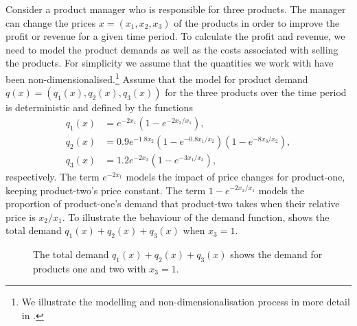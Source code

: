 \documentclass[main.tex]{subfiles}
\begin{document}
Consider a product manager who is responsible for three products.
The manager can change the prices
$x=(x_1,x_2,x_3)$
of the products in order to improve the profit or revenue for a given
time period.
To calculate the profit and revenue, we need to model the product
demands as well as the costs associated with selling the products.
For simplicity we assume that the quantities we work with have
been non-dimensionalised.\footnote{We illustrate the modelling and
  non-dimensionalisation process in more detail
  in .}
Assume that the model for product demand $q(x)=(q_1(x),q_2(x),q_3(x))$
for the three products over the time period is
deterministic and defined by the functions
\begin{align}
  q_1(x) &= e^{-2x_1}(1-e^{-2x_2/x_1}),\\
  q_2(x) &= 0.9e^{-1.8x_2}(1-e^{-0.8x_1/x_2})(1-e^{-8x_3/x_2}),\\
  q_3(x) &= 1.2e^{-2x_3}(1-e^{-3x_1/x_3}),
\end{align}
respectively.
The term $e^{-2x_1}$  models the impact of price
changes for product-one, keeping product-two's price constant.
The term $1-e^{-2x_2/x_1}$ models the proportion of product-one's
demand that product-two takes when their relative price is $x_2/x_1$.
To illustrate the behaviour of the demand function,
 shows the total demand $q_1(x)+q_2(x)+q_3(x)$ when
$x_3=1$.
\begin{figure}[htbp]
  \centering
  \caption[Demand for three products]{The total demand $q_1(x)+q_2(x)+q_3(x)$ shows the demand for products one
    and two with $x_3=1$.
  }\label{fig:total_volume_2d}
\end{figure}
\end{document}
